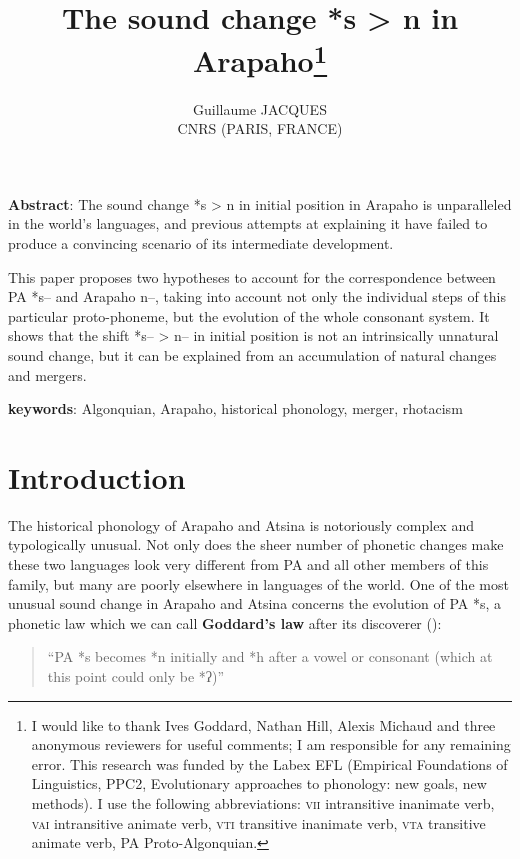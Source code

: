 \documentclass[oldfontcommands,oneside,a4paper,11pt]{article}
\begin{document}
\title{The sound change *s > n in Arapaho\footnote{I would like to thank Ives Goddard, Nathan Hill, Alexis Michaud and three anonymous reviewers for useful comments; I am responsible for any remaining error. This research was funded by the Labex EFL (Empirical Foundations of Linguistics, PPC2, Evolutionary approaches to phonology: new goals, new methods). I use the following abbreviations: \textsc{vii} intransitive inanimate verb, \textsc{vai} intransitive animate verb, \textsc{vti} transitive inanimate verb, \textsc{vta} transitive animate verb, PA Proto-Algonquian. } }  
\author{Guillaume JACQUES\\ CNRS (PARIS, FRANCE)}
\maketitle

\textbf{Abstract}: The sound change *s > n in initial position in Arapaho is unparalleled in the world's languages, and previous attempts at explaining it have failed to produce a convincing scenario of its intermediate development.

This paper proposes two hypotheses to account for the correspondence between PA *s-- and Arapaho n--, taking into account not only the individual steps of this particular proto-phoneme, but the evolution of the whole consonant system. It shows that the shift *s-- > n-- in initial position is not an intrinsically unnatural sound change, but  it can be explained from  an accumulation of natural changes and mergers.



\textbf{keywords}: Algonquian, Arapaho, historical phonology, merger, rhotacism
\section{Introduction}
The historical phonology of Arapaho and Atsina is notoriously complex and typologically unusual.  Not only does  the sheer number of phonetic changes make these two languages look very different from PA and all other members of this family, but many are   poorly elsewhere in languages of the world. One of the most unusual sound change in Arapaho and Atsina concerns the evolution of PA *s, a phonetic law which we can call \textbf{Goddard's law} after its discoverer (\citealt[107]{goddard74arapaho}):

\begin{quote} ``PA *s becomes *n initially and *h after a vowel or consonant (which at this point could only be *ʔ)'' \end{quote}
\end{document}
